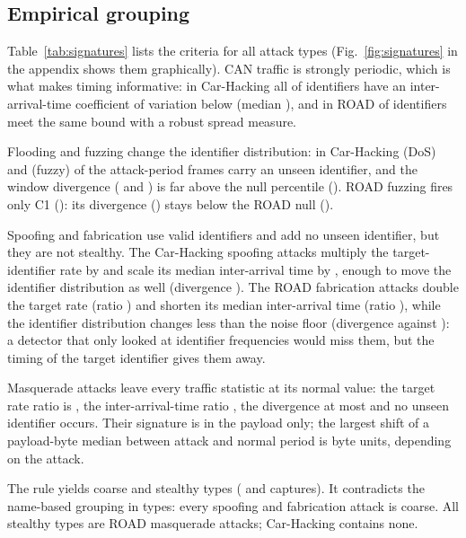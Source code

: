 \subsection{Empirical grouping}
Table~\ref{tab:signatures} lists the criteria for all \NTypes{} attack types (Fig.~\ref{fig:signatures} in the
appendix shows them graphically). CAN traffic is strongly periodic, which is what makes timing informative: in
Car-Hacking all \PeriodicCH{} of \IdsCH{} identifiers have an inter-arrival-time coefficient of variation below
\CVThr{} (median \MedianCVCH), and in ROAD \RobustPeriodicROAD{} of \IdsROAD{} identifiers meet the same bound with
a robust spread measure.

Flooding and fuzzing change the identifier distribution: in Car-Hacking \DoSUnseenPct{} (DoS) and
\FuzzyUnseenPct{} (fuzzy) of the attack-period frames carry an unseen identifier, and the window divergence
(\DoSJSD{} and \FuzzyJSD) is far above the null percentile (\NullQCH). ROAD fuzzing fires only C1
(\RoadFuzzUnseenPct): its divergence (\RoadFuzzJSD) stays below the ROAD null (\NullQROAD).

Spoofing and fabrication use valid identifiers and add no unseen identifier, but they are not stealthy. The
Car-Hacking spoofing attacks multiply the target-identifier rate by \SpoofRate{} and scale its median inter-arrival
time by \SpoofIAT{}, enough to move the identifier distribution as well (divergence \SpoofJSD). The ROAD fabrication
attacks double the target rate (ratio \FabRate) and shorten its median inter-arrival time (ratio \FabIAT), while
the identifier distribution changes less than the noise floor (divergence \FabJSD{} against \NullQROAD): a detector
that only looked at identifier frequencies would miss them, but the timing of the target identifier gives them
away.

Masquerade attacks leave every traffic statistic at its normal value: the target rate ratio is \MasqRate, the
inter-arrival-time ratio \MasqIAT, the divergence at most \MasqJSDMax{} and no unseen identifier occurs. Their
signature is in the payload only; the largest shift of a payload-byte median between attack and normal period is
\MasqByteShift{} byte units, depending on the attack.

The rule yields \NCoarse{} coarse and \NStealthy{} stealthy types (\NCoarseCaptures{} and \NStealthyCaptures{}
captures). It contradicts the name-based grouping in \NPlanContradict{} types: every spoofing and fabrication
attack is coarse. All stealthy types are ROAD masquerade attacks; Car-Hacking contains none.

